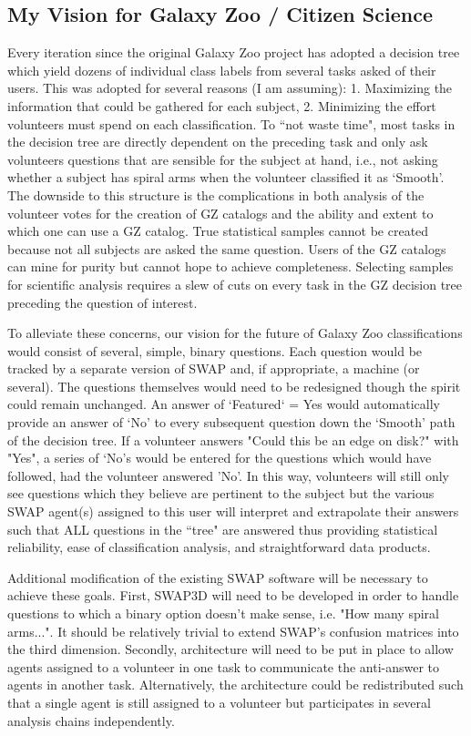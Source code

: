 \documentclass[twocolumn]{aastex6}
\begin{document}
\subsection{My Vision for Galaxy Zoo / Citizen Science}
Every iteration since the original Galaxy Zoo project has adopted a decision tree
which yield dozens of individual class labels from several tasks asked of their users. 
This was adopted for several reasons (I am assuming): 1. Maximizing the information 
that could be gathered for each subject, 2. Minimizing the effort volunteers must 
spend on each classification. To ``not waste time", most tasks in the decision tree
are directly dependent on the preceding task and only ask volunteers questions that
are sensible for the subject at hand, i.e., not asking whether a subject has spiral arms
when the volunteer classified it as `Smooth'. The downside to this structure is the 
complications in both analysis of the volunteer votes for the creation of GZ catalogs
and the ability and extent to which one can use a GZ catalog. True 
statistical samples cannot be created because not all subjects are asked the same 
question. Users of the GZ catalogs can mine for purity but cannot hope to achieve
completeness. Selecting samples for scientific analysis requires a slew of cuts on 
every task in the GZ decision tree preceding the question of interest. 

To alleviate these concerns, our vision for the future of Galaxy Zoo classifications
would consist of several, simple, binary questions. Each question would be tracked by a 
separate version of SWAP and, if appropriate, a machine (or several). The questions
themselves would need to be redesigned though the spirit could remain unchanged. 
An answer of `Featured` = Yes would automatically provide an answer of  `No' to every 
subsequent question down the `Smooth' path of the decision tree. 
If a volunteer answers "Could this be an edge on disk?" with "Yes", a series of `No's 
would be entered for the questions which would have followed, had the volunteer answered 'No'.
In this way, volunteers will still only see questions which they believe are pertinent to the 
subject but the various SWAP agent(s) assigned to this user will interpret and 
extrapolate their answers such that ALL questions in the ``tree" are answered thus
providing statistical reliability, ease of classification analysis, and straightforward 
data products.  

Additional modification of the existing SWAP software will be necessary to achieve
these goals. First, SWAP3D will need to be developed in order to handle questions to 
which a binary option doesn't make sense, i.e. "How many spiral arms...". It should be 
relatively trivial to extend SWAP's confusion matrices into the third dimension. 
Secondly, architecture will need to be put in place to  allow agents assigned to a 
volunteer in one task to communicate the anti-answer to agents in another task. 
Alternatively, the architecture could be redistributed such that a single agent is
still assigned to a volunteer but participates in several analysis chains independently. 
\end{document}
